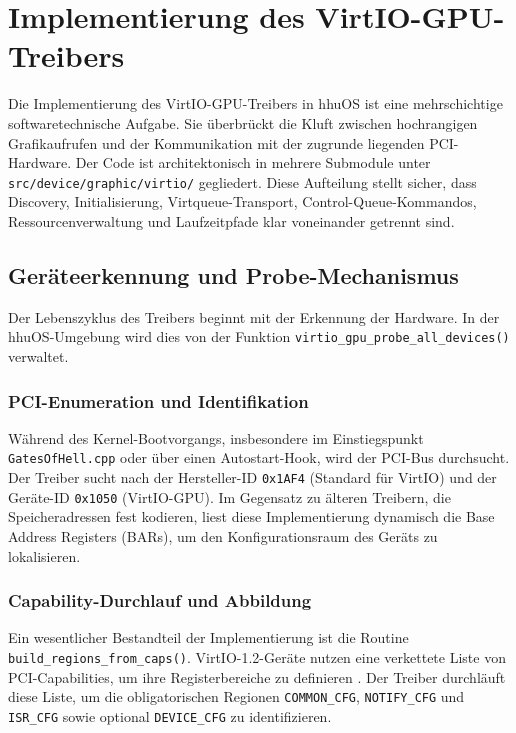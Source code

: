 \chapter{Implementierung des VirtIO-GPU-Treibers}

Die Implementierung des VirtIO-GPU-Treibers in hhuOS ist eine mehrschichtige
softwaretechnische Aufgabe. Sie überbrückt die Kluft zwischen hochrangigen
Grafikaufrufen und der Kommunikation mit der zugrunde liegenden PCI-Hardware.
Der Code ist architektonisch in mehrere Submodule unter
\texttt{src/device/graphic/virtio/} gegliedert. Diese Aufteilung stellt sicher,
dass Discovery, Initialisierung, Virtqueue-Transport, Control-Queue-Kommandos,
Ressourcenverwaltung und Laufzeitpfade klar voneinander getrennt sind.

\section{Geräteerkennung und Probe-Mechanismus}
Der Lebenszyklus des Treibers beginnt mit der Erkennung der Hardware. In der
hhuOS-Umgebung wird dies von der Funktion
\texttt{virtio\_gpu\_probe\_all\_devices()} verwaltet.

\subsection{PCI-Enumeration und Identifikation}
Während des Kernel-Bootvorgangs, insbesondere im Einstiegspunkt
\texttt{GatesOfHell.cpp} oder über einen Autostart-Hook, wird der PCI-Bus
durchsucht. Der Treiber sucht nach der Hersteller-ID \texttt{0x1AF4}
(Standard für VirtIO) und der Geräte-ID \texttt{0x1050} (VirtIO-GPU). Im
Gegensatz zu älteren Treibern, die Speicheradressen fest kodieren, liest diese
Implementierung dynamisch die Base Address Registers (BARs), um den
Konfigurationsraum des Geräts zu lokalisieren.

\subsection{Capability-Durchlauf und Abbildung}
Ein wesentlicher Bestandteil der Implementierung ist die Routine
\texttt{build\_regions\_from\_caps()}. VirtIO-1.2-Geräte nutzen eine verkettete
Liste von PCI-Capabilities, um ihre Registerbereiche zu definieren
\cite{Virtio12}. Der Treiber durchläuft diese Liste, um die obligatorischen
Regionen \texttt{COMMON\_CFG}, \texttt{NOTIFY\_CFG} und \texttt{ISR\_CFG} sowie
optional \texttt{DEVICE\_CFG} zu identifizieren.

